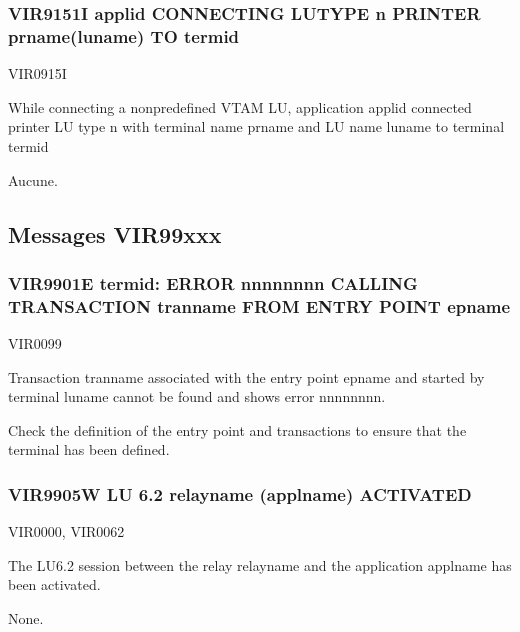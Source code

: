 \documentclass[letterpaper,10pt,english]{sphinxmanual}
\begin{document}
\subsubsection{VIR9151I applid CONNECTING LUTYPE n PRINTER prname(luname) TO termid}
\label{\detokenize{messages:vir9151i-applid-connecting-lutype-n-printer-prname-luname-to-termid}}\begin{description}
\sphinxAtStartPar
VIR0915I

\sphinxAtStartPar
While connecting a non\sphinxhyphen{}predefined VTAM LU, application applid connected printer LU type n with terminal name prname and LU name luname to terminal termid

\sphinxAtStartPar
Aucune.

\end{description}


\subsection{Messages VIR99xxx}
\label{\detokenize{messages:messages-vir99xxx}}

\subsubsection{VIR9901E termid: ERROR nnnnnnnn CALLING TRANSACTION tranname FROM ENTRY POINT epname}
\label{\detokenize{messages:vir9901e-termid-error-nnnnnnnn-calling-transaction-tranname-from-entry-point-epname}}\begin{description}
\sphinxAtStartPar
VIR0099

\sphinxAtStartPar
Transaction tranname associated with the entry point epname and started by terminal luname cannot be found and shows error nnnnnnnn.

\sphinxAtStartPar
Check the definition of the entry point and transactions to ensure that the terminal has been defined.

\end{description}


\subsubsection{VIR9905W LU 6.2 relayname (applname) ACTIVATED}
\label{\detokenize{messages:vir9905w-lu-6-2-relayname-applname-activated}}\begin{description}
\sphinxAtStartPar
VIR0000, VIR0062

\sphinxAtStartPar
The LU6.2 session between the relay relayname and the application applname has been activated.

\sphinxAtStartPar
None.

\end{description}
\end{document}
